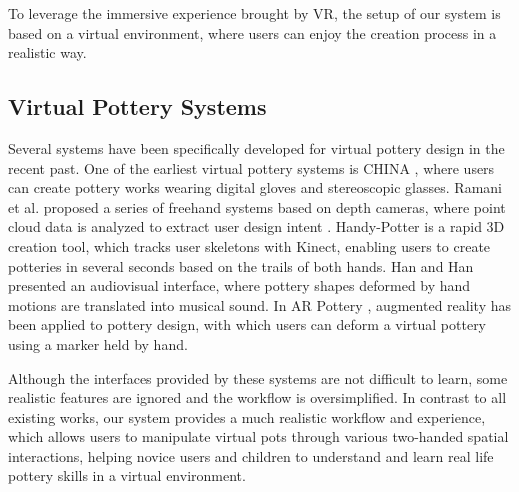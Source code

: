 \documentclass{svjour3}                     %
\begin{document}
To leverage the immersive experience brought by VR, the setup of our system is based on a virtual environment, where users can enjoy the creation process in a realistic way.

\subsection{Virtual Pottery Systems}
\label{sec:2.3}


Several systems have been specifically developed for virtual pottery design in the recent past.
One of the earliest virtual pottery systems is CHINA \cite{korida1997interactive}, where users can create pottery works wearing digital gloves and stereoscopic glasses.
Ramani et al. proposed a series of freehand systems based on depth cameras, where point cloud data is analyzed to extract user design intent \cite{ramani2014zpots,ramani2015gesture,ramani2016extracting}.
Handy-Potter \cite{murugappan2013handy} is a rapid 3D creation tool, which tracks user skeletons with Kinect, enabling users to create potteries in several seconds based on the trails of both hands.
Han and Han \cite{han2014virtual} presented an audiovisual interface, where pottery shapes deformed by hand motions are translated into musical sound.
In AR Pottery \cite{han2007ar}, augmented reality has been applied to pottery design, with which users can deform a virtual pottery using a marker held by hand.

Although the interfaces provided by these systems are not difficult to learn, some realistic features are ignored and the workflow is oversimplified.
In contrast to all existing works, our system provides a much realistic workflow and experience, which allows users to manipulate virtual pots through various two-handed spatial interactions, helping novice users and children to understand and learn real life pottery skills in a virtual environment.
\end{document}
